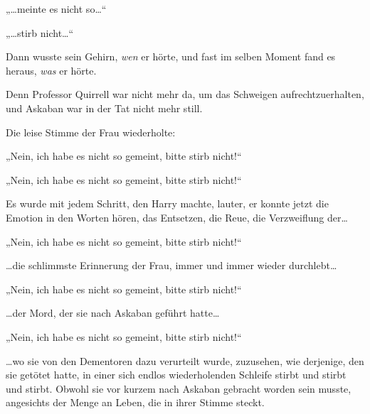 „…meinte es nicht so…“

„…stirb nicht…“

Dann wusste sein Gehirn, \emph{wen} er hörte, und fast im selben Moment fand es heraus, \emph{was} er hörte.

Denn Professor Quirrell war nicht mehr da, um das Schweigen aufrechtzuerhalten, und Askaban war in der Tat nicht mehr still.

Die leise Stimme der Frau wiederholte:

„Nein, ich habe es nicht so gemeint, bitte stirb nicht!“

„Nein, ich habe es nicht so gemeint, bitte stirb nicht!“

Es wurde mit jedem Schritt, den Harry machte, lauter, er konnte jetzt die Emotion in den Worten hören, das Entsetzen, die Reue, die Verzweiflung der…

„Nein, ich habe es nicht so gemeint, bitte stirb nicht!“

…die schlimmste Erinnerung der Frau, immer und immer wieder durchlebt…

„Nein, ich habe es nicht so gemeint, bitte stirb nicht!“

…der Mord, der sie nach Askaban geführt hatte…

„Nein, ich habe es nicht so gemeint, bitte stirb nicht!“

…wo sie von den Dementoren dazu verurteilt wurde, zuzusehen, wie derjenige, den sie getötet hatte, in einer sich endlos wiederholenden Schleife stirbt und stirbt und stirbt. Obwohl sie vor kurzem nach Askaban gebracht worden sein musste, angesichts der Menge an Leben, die in ihrer Stimme steckt.

